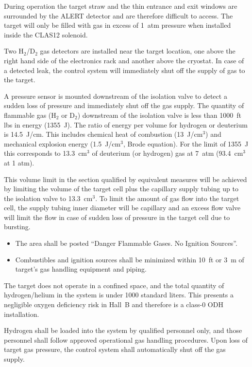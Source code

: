 During operation the target straw and the thin entrance and exit windows are surrounded by the ALERT
detector and are therefore difficult to access. The target will only be filled with gas in excess
of 1~atm pressure when installed inside the CLAS12 solenoid.

Two H$_2$/D$_2$ gas detectors are installed near the target location, one above the right hand side of the
electronics rack and another above the cryostat. In case of a detected leak, the control system will
immediately shut off the supply of gas to the target.

A pressure sensor is mounted downstream of the isolation valve to detect a sudden loss of pressure and
immediately shut off the gas supply. The quantity of flammable gas (H$_2$ or D$_2$) downstream of the
isolation valve is less than 1000~ft lbs in energy (1355~J). The ratio of energy per volume for hydrogen
or deuterium is 14.5~J/cm. This includes chemical heat of combustion (13~J/cm$^3$) and mechanical explosion
energy (1.5~J/cm$^3$, Brode equation). For the limit of 1355~J this corresponds to 13.3~cm$^3$ of deuterium
(or hydrogen) gas at 7~atm (93.4~cm$^3$ at 1 atm).

This volume limit in the section qualified by equivalent measures will be achieved by limiting the volume
of the target cell plus the capillary supply tubing up to the isolation valve to 13.3~cm$^3$. To limit the
amount of gas flow into the target cell, the supply tubing inner diameter will be capillary and an excess
flow valve will limit the flow in case of sudden loss of pressure in the target cell due to bursting.

\begin{itemize}
\item The area shall be posted ``Danger Flammable Gases. No Ignition Sources''.
\item Combustibles and ignition sources shall be minimized within 10~ft or 3~m of target’s gas handling
  equipment and piping.
\end{itemize}

The target does not operate in a confined space, and the total quantity of hydrogen/helium in the system is
under 1000 standard liters. This presents a negligible oxygen deficiency risk in Hall~B and therefore is a
class-0 ODH installation.

Hydrogen shall be loaded into the system by qualified personnel only, and those personnel shall follow
approved operational gas handling procedures. Upon loss of target gas pressure, the control system shall
automatically shut off the gas supply.

